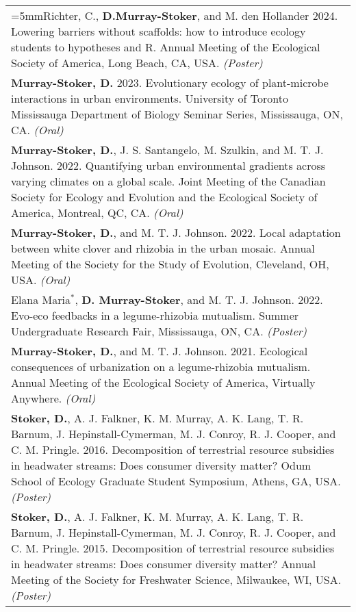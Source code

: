 \documentclass[letterpaper,11pt,oneside]{article}
\begin{document}
\def\arraystretch{1.4}
\noindent \begin{longtable}{@{} >{\raggedright\arraybackslash}p{17.2cm}}
\hangindent=5mmRichter, C., \textbf{D.Murray-Stoker}, and M. den Hollander 2024. Lowering barriers without scaffolds: how to introduce ecology students to hypotheses and R. Annual Meeting of the Ecological Society of America, Long Beach, CA, USA. \textit{(Poster)} \\
\hangindent=5mm\textbf{Murray-Stoker, D.} 2023. Evolutionary ecology of plant-microbe interactions in urban environments. University of Toronto Mississauga Department of Biology Seminar Series, Mississauga, ON, CA. \textit{(Oral)} \\
\hangindent=5mm\textbf{Murray-Stoker, D.}, J. S. Santangelo, M. Szulkin, and M. T. J. Johnson. 2022. Quantifying urban environmental gradients across varying climates on a global scale. Joint Meeting of the Canadian Society for Ecology and Evolution and the Ecological Society of America, Montreal, QC, CA. \textit{(Oral)} \\
\hangindent=5mm\textbf{Murray-Stoker, D.}, and M. T. J. Johnson. 2022. Local adaptation between white clover and rhizobia in the urban mosaic. Annual Meeting of the Society for the Study of Evolution, Cleveland, OH, USA. \textit{(Oral)} \\
\hangindent=5mm Elana Maria$^{*}$, \textbf{D. Murray-Stoker}, and M. T. J. Johnson. 2022. Evo-eco feedbacks in a legume-rhizobia mutualism. Summer Undergraduate Research Fair, Mississauga, ON, CA. \textit{(Poster)} \\
\hangindent=5mm\textbf{Murray-Stoker, D.}, and M. T. J. Johnson. 2021. Ecological consequences of urbanization on a legume-rhizobia mutualism. Annual Meeting of the Ecological Society of America, Virtually Anywhere. \textit{(Oral)} \\
\hangindent=5mm\textbf{Stoker, D.}, A. J. Falkner, K. M. Murray, A. K. Lang, T. R. Barnum, J. Hepinstall-Cymerman, M. J. Conroy, R. J. Cooper, and C. M. Pringle. 2016. Decomposition of terrestrial resource subsidies in headwater streams: Does consumer diversity matter? Odum School of Ecology Graduate Student Symposium, Athens, GA, USA. \textit{(Poster)} \\
\hangindent=5mm\textbf{Stoker, D.}, A. J. Falkner, K. M. Murray, A. K. Lang, T. R. Barnum, J. Hepinstall-Cymerman, M. J. Conroy, R. J. Cooper, and C. M. Pringle. 2015. Decomposition of terrestrial resource subsidies in headwater streams: Does consumer diversity matter? Annual Meeting of the Society for Freshwater Science, Milwaukee, WI, USA. \textit{(Poster)} \\

\end{longtable}
\end{document}
